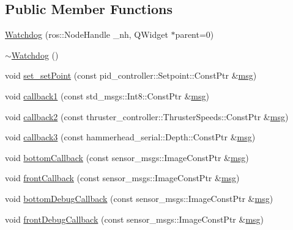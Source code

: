 \subsection*{Public Member Functions}
\begin{DoxyCompactItemize}
\item 
\hyperlink{classWatchdog_a58770dbf04157eb64e8502665aac5685}{Watchdog} (ros\+::\+Node\+Handle \+\_\+nh, Q\+Widget $\ast$parent=0)
\item 
\hyperlink{classWatchdog_ad836a36b5eb5dbe134d4050d49a95d4e}{$\sim$\+Watchdog} ()
\item 
void \hyperlink{classWatchdog_a623beedf7428cecd0e236a4c1c51a2cf}{set\+\_\+set\+Point} (const pid\+\_\+controller\+::\+Setpoint\+::\+Const\+Ptr \&\hyperlink{classWatchdog_a5ecebf3cf248b17b31e66c70daf53fc2}{msg})
\item 
void \hyperlink{classWatchdog_a864b238fd9c36e085099a833796ac05f}{callback1} (const std\+\_\+msgs\+::\+Int8\+::\+Const\+Ptr \&\hyperlink{classWatchdog_a5ecebf3cf248b17b31e66c70daf53fc2}{msg})
\item 
void \hyperlink{classWatchdog_a4d83836052fab826c6da7dc5818e14c1}{callback2} (const thruster\+\_\+controller\+::\+Thruster\+Speeds\+::\+Const\+Ptr \&\hyperlink{classWatchdog_a5ecebf3cf248b17b31e66c70daf53fc2}{msg})
\item 
void \hyperlink{classWatchdog_ac546c98579aeeb337fbd21f64182c3dc}{callback3} (const hammerhead\+\_\+serial\+::\+Depth\+::\+Const\+Ptr \&\hyperlink{classWatchdog_a5ecebf3cf248b17b31e66c70daf53fc2}{msg})
\item 
void \hyperlink{classWatchdog_a1a703a50d75b91070353c0e2df74c451}{bottom\+Callback} (const sensor\+\_\+msgs\+::\+Image\+Const\+Ptr \&\hyperlink{classWatchdog_a5ecebf3cf248b17b31e66c70daf53fc2}{msg})
\item 
void \hyperlink{classWatchdog_a1edafd8641955c260939218a769a3a7a}{front\+Callback} (const sensor\+\_\+msgs\+::\+Image\+Const\+Ptr \&\hyperlink{classWatchdog_a5ecebf3cf248b17b31e66c70daf53fc2}{msg})
\item 
void \hyperlink{classWatchdog_a8923196d18f5a0efed360181708f870d}{bottom\+Debug\+Callback} (const sensor\+\_\+msgs\+::\+Image\+Const\+Ptr \&\hyperlink{classWatchdog_a5ecebf3cf248b17b31e66c70daf53fc2}{msg})
\item 
void \hyperlink{classWatchdog_a431c9cb6c6f73c9950abe39b4a9c739b}{front\+Debug\+Callback} (const sensor\+\_\+msgs\+::\+Image\+Const\+Ptr \&\hyperlink{classWatchdog_a5ecebf3cf248b17b31e66c70daf53fc2}{msg})
\item 

\end{DoxyCompactItemize}
